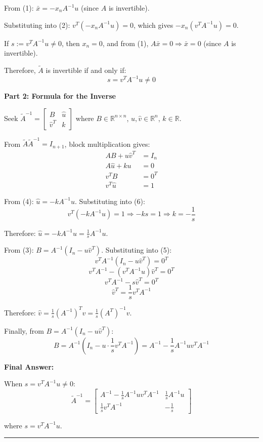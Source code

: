 From (1): $\bar{x} = -x_n A^{-1}u$ (since $A$ is invertible).

Substituting into (2): $v^T(-x_n A^{-1}u) = 0$, which gives $-x_n(v^T A^{-1}u) = 0$.

If $s := v^TA^{-1}u \neq 0$, then $x_n = 0$, and from (1), $A\bar{x} = 0 \Rightarrow \bar{x} = 0$ (since $A$ is invertible).

Therefore, $\tilde{A}$ is invertible if and only if:
$$\boxed{s = v^TA^{-1}u \neq 0}$$

\textbf{Part 2: Formula for the Inverse}

Seek $\tilde{A}^{-1} = \begin{bmatrix} B & \hat{u} \\ \hat{v}^T & k \end{bmatrix}$ where $B \in \mathbb{R}^{n \times n}$, $\hat{u}, \hat{v} \in \mathbb{R}^n$, $k \in \mathbb{R}$.

From $\tilde{A}\tilde{A}^{-1} = I_{n+1}$, block multiplication gives:
\begin{align}
AB + u\hat{v}^T &= I_n \tag{3}\\
A\hat{u} + ku &= 0 \tag{4}\\
v^TB &= 0^T \tag{5}\\
v^T\hat{u} &= 1 \tag{6}
\end{align}

From (4): $\hat{u} = -kA^{-1}u$. Substituting into (6):
$$v^T(-kA^{-1}u) = 1 \Rightarrow -ks = 1 \Rightarrow k = -\frac{1}{s}$$

Therefore: $\hat{u} = -kA^{-1}u = \frac{1}{s}A^{-1}u$.

From (3): $B = A^{-1}(I_n - u\hat{v}^T)$. Substituting into (5):
$$v^TA^{-1}(I_n - u\hat{v}^T) = 0^T$$
$$v^TA^{-1} - (v^TA^{-1}u)\hat{v}^T = 0^T$$
$$v^TA^{-1} - s\hat{v}^T = 0^T$$
$$\hat{v}^T = \frac{1}{s}v^TA^{-1}$$

Therefore: $\hat{v} = \frac{1}{s}(A^{-1})^Tv = \frac{1}{s}(A^T)^{-1}v$.

Finally, from $B = A^{-1}(I_n - u\hat{v}^T)$:
$$B = A^{-1}\left(I_n - u \cdot \frac{1}{s}v^TA^{-1}\right) = A^{-1} - \frac{1}{s}A^{-1}uv^TA^{-1}$$

\textbf{Final Answer:}

When $s = v^TA^{-1}u \neq 0$:
$$\boxed{\tilde{A}^{-1} = \begin{bmatrix} 
A^{-1} - \frac{1}{s}A^{-1}uv^TA^{-1} & \frac{1}{s}A^{-1}u \\
\frac{1}{s}v^TA^{-1} & -\frac{1}{s}
\end{bmatrix}}$$

where $s = v^TA^{-1}u$.

\vspace{2em}
\noindent\rule{\textwidth}{0.4pt}
